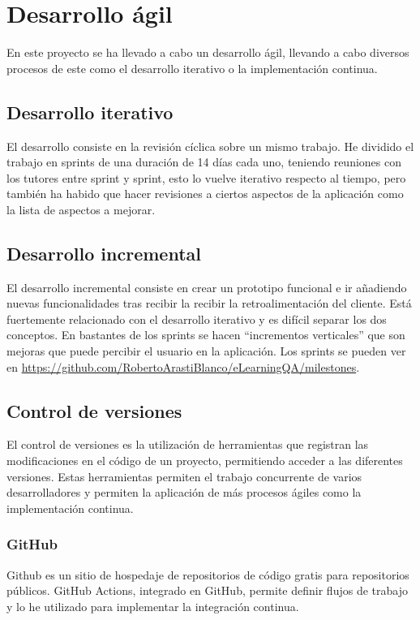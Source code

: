 \section{Desarrollo ágil}
En este proyecto se ha llevado a cabo un desarrollo ágil, llevando a cabo diversos procesos de este como el desarrollo iterativo o la implementación continua.
\subsection{Desarrollo iterativo}
El desarrollo consiste en la revisión cíclica sobre un mismo trabajo.
He dividido el trabajo en sprints de una duración de 14 días cada uno, teniendo reuniones con los tutores entre sprint y sprint, esto lo vuelve iterativo respecto al tiempo, pero también ha habido que hacer revisiones a ciertos aspectos de la aplicación como la lista de aspectos a mejorar.
\subsection{Desarrollo incremental}
El desarrollo incremental consiste en crear un prototipo funcional e ir añadiendo nuevas funcionalidades tras recibir la recibir la retroalimentación del cliente. Está fuertemente relacionado con el desarrollo iterativo y es difícil separar los dos conceptos. En bastantes de los sprints se hacen ``incrementos verticales'' que son mejoras que puede percibir el usuario en la aplicación. 
Los sprints se pueden ver en \url{https://github.com/RobertoArastiBlanco/eLearningQA/milestones}.
\subsection{Control de versiones}
El control de versiones es la utilización de herramientas que registran las modificaciones en el código de un proyecto, permitiendo acceder a las diferentes versiones. Estas herramientas permiten el trabajo concurrente de varios desarrolladores y permiten la aplicación de más procesos ágiles como la implementación continua.
\subsubsection{GitHub}
Github es un sitio de hospedaje de repositorios de código gratis para repositorios públicos.
GitHub Actions, integrado en GitHub, permite definir flujos de trabajo y lo he utilizado para implementar la integración continua.
